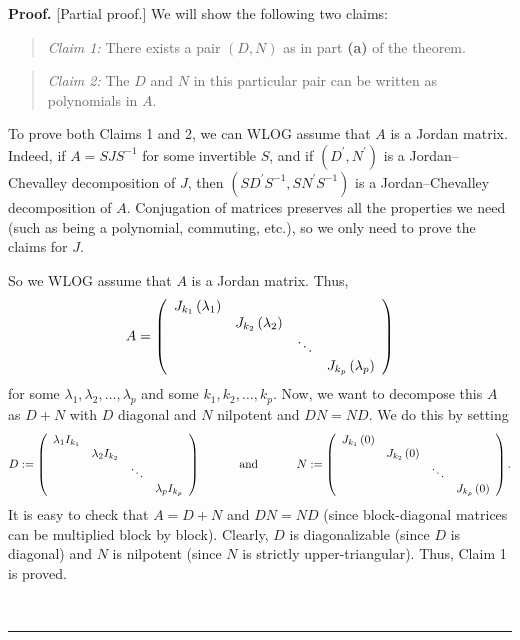 \documentclass[numbers=enddot,12pt,final,onecolumn,notitlepage]{scrartcl}%
\numberwithin{exer}{subsection}
\theoremstyle{definition}
\newenvironment{statement}{\begin{quote}}{\end{quote}}
\newenvironment{proof}[1][Proof]{\noindent\textbf{#1.} }{\ \rule{0.5em}{0.5em}}
\begin{document}
\begin{proof}
[Partial proof.] We will show the following two claims:

\begin{statement}
\textit{Claim 1:} There exists a pair $\left(  D,N\right)  $ as in part
\textbf{(a)} of the theorem.
\end{statement}

\begin{statement}
\textit{Claim 2:} The $D$ and $N$ in this particular pair can be written as
polynomials in $A$.
\end{statement}

To prove both Claims 1 and 2, we can WLOG assume that $A$ is a Jordan matrix.
Indeed, if $A=SJS^{-1}$ for some invertible $S$, and if $\left(  D^{\prime
},N^{\prime}\right)  $ is a Jordan--Chevalley decomposition of $J$, then
$\left(  SD^{\prime}S^{-1},SN^{\prime}S^{-1}\right)  $ is a Jordan--Chevalley
decomposition of $A$. Conjugation of matrices preserves all the properties we
need (such as being a polynomial, commuting, etc.), so we only need to prove
the claims for $J$.

So we WLOG assume that $A$ is a Jordan matrix. Thus,%
\[
A=\left(
\begin{array}
[c]{cccc}%
J_{k_{1}}\left(  \lambda_{1}\right)   &  &  & \\
& J_{k_{2}}\left(  \lambda_{2}\right)   &  & \\
&  & \ddots & \\
&  &  & J_{k_{p}}\left(  \lambda_{p}\right)
\end{array}
\right)
\]
for some $\lambda_{1},\lambda_{2},\ldots,\lambda_{p}$ and some $k_{1}%
,k_{2},\ldots,k_{p}$. Now, we want to decompose this $A$ as $D+N$ with $D$
diagonal and $N$ nilpotent and $DN=ND$. We do this by setting%
\[
D:=\left(
\begin{array}
[c]{cccc}%
\lambda_{1}I_{k_{1}} &  &  & \\
& \lambda_{2}I_{k_{2}} &  & \\
&  & \ddots & \\
&  &  & \lambda_{p}I_{k_{p}}%
\end{array}
\right)  \ \ \ \ \ \ \ \ \ \ \text{and}\ \ \ \ \ \ \ \ \ \ N:=\left(
\begin{array}
[c]{cccc}%
J_{k_{1}}\left(  0\right)   &  &  & \\
& J_{k_{2}}\left(  0\right)   &  & \\
&  & \ddots & \\
&  &  & J_{k_{p}}\left(  0\right)
\end{array}
\right)  .
\]
It is easy to check that $A=D+N$ and $DN=ND$ (since block-diagonal matrices
can be multiplied block by block). Clearly, $D$ is diagonalizable (since $D$
is diagonal) and $N$ is nilpotent (since $N$ is strictly upper-triangular).
Thus, Claim 1 is proved.


\end{proof}
\end{document}
